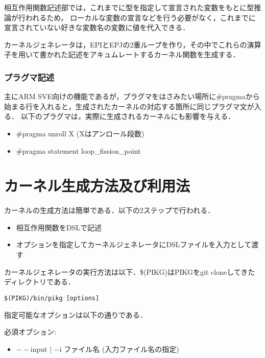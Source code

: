 \documentclass{article}
\begin{document}
相互作用関数記述部では，これまでに型を指定して宣言された変数をもとに型推論が行われるため，
ローカルな変数の宣言などを行う必要がなく，これまでに宣言されていない好きな変数名の変数に値を代入できる．

カーネルジェネレータは，EPIとEPJの2重ループを作り，その中でこれらの演算子を用いて書かれた記述をアキュムレートするカーネル関数を生成する．

\subsubsection{プラグマ記述}
主にARM SVE向けの機能であるが，プラグマをはさみたい場所に\#pragmaから始まる行を入れると，生成されたカーネルの対応する箇所に同じプラグマ文が入る．
以下のプラグマは，実際に生成されるカーネルにも影響を与える．
 \begin{itemize}
  \item \#pragma unroll X (Xはアンロール段数)
  \item \#pragma statement loop\_fission\_point
 \end{itemize}


\section{カーネル生成方法及び利用法}
カーネルの生成方法は簡単である．以下の2ステップで行われる．
 \begin{itemize}
  \item 相互作用関数をDSLで記述
  \item オプションを指定してカーネルジェネレータにDSLファイルを入力として渡す
 \end{itemize}
 カーネルジェネレータの実行方法は以下．\$(PIKG)はPIKGをgit cloneしてきたディレクトリである．
\begin{verbatim}
$(PIKG)/bin/pikg [options]
\end{verbatim}

 指定可能なオプションは以下の通りである．
 
   必須オプション:
  \begin{itemize}
   \item $--$input $|$ $-$i ファイル名 (入力ファイル名の指定)
  \end{itemize}
\end{document}
